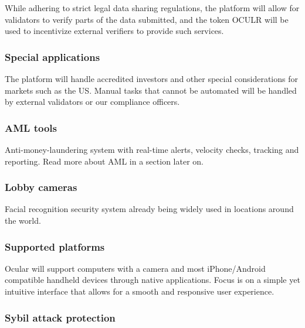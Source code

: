 \documentclass[a4paper]{article}
\begin{document}
While adhering to strict legal data sharing regulations, the platform will allow for validators to verify parts of the data submitted, and the token OCULR will be used to incentivize external verifiers to provide such services.

\subsubsection*{Special applications}
The platform will handle accredited investors and other special considerations for markets such as the US. Manual tasks that cannot be automated will be handled by external validators or our compliance officers. 

\subsubsection*{AML tools}
Anti-money-laundering system with real-time alerts, velocity checks, tracking and reporting. Read more about AML in a section later on.

\subsubsection*{Lobby cameras}
Facial recognition security system already being widely used in locations around the world.

\subsubsection*{Supported platforms}

Ocular will support computers with a camera and most iPhone/Android compatible handheld devices through native applications. Focus is on a simple yet intuitive interface that allows for a smooth and responsive user experience.

\subsubsection*{Sybil attack protection}
\end{document}
